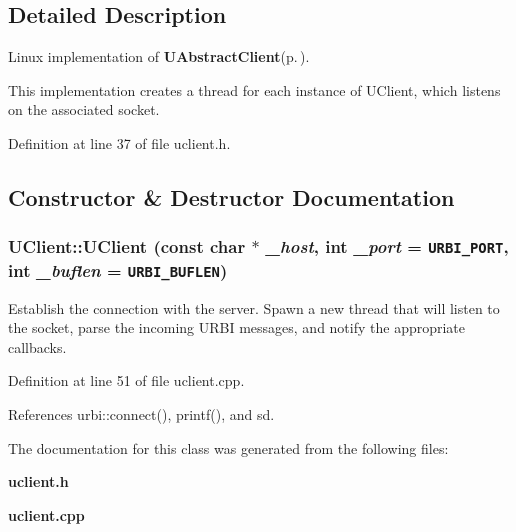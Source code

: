 \subsection{Detailed Description}
Linux implementation of {\bf UAbstract\-Client}{\rm (p.\,\pageref{classUAbstractClient})}. 

This implementation creates a thread for each instance of UClient, which listens on the associated socket. 



Definition at line 37 of file uclient.h.

\subsection{Constructor \& Destructor Documentation}
\subsubsection{\setlength{\rightskip}{0pt plus 5cm}UClient::UClient (const char $\ast$ {\em \_\-host}, int {\em \_\-port} = {\tt {\bf URBI\_\-PORT}}, int {\em \_\-buflen} = {\tt {\bf URBI\_\-BUFLEN}})}\label{classUClient_a0}


Establish the connection with the server. Spawn a new thread that will listen to the socket, parse the incoming URBI messages, and notify the appropriate callbacks. 

Definition at line 51 of file uclient.cpp.

References urbi::connect(), printf(), and sd.

The documentation for this class was generated from the following files:\begin{CompactItemize}
\item 
{\bf uclient.h}\item 
{\bf uclient.cpp}\end{CompactItemize}

